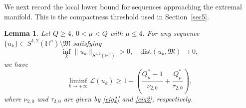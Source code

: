 \documentclass[11pt]{article}
\newtheorem{lemma}{Lemma}[section]
\begin{document}
{We next record the local lower bound for sequences approaching the extremal manifold. This is the compactness threshold used in Section~\ref{sec5}.}
\begin{lemma}\label{local}
Let $Q\geq 4$, $0<\mu< Q$ with $\mu\leq 4$. For any sequence $\{u_k\}\subset S^{1,2}(\mathbb{H}^{n})\setminus \mathfrak{M}$ satisfying
\begin{equation*}
 \inf\limits_k \|u_k\|_{S^{1,2}(\mathbb{H}^{n})}>0,\quad \mathrm{dist}(u_k,\mathfrak{M})\rightarrow0,
\end{equation*}
we have
\begin{equation}\label{local1}
 \liminf\limits_{k\rightarrow+\infty}\mathcal{L}(u_k)\geq 1-\left(\frac{Q^{\ast}_{\mu}-1}{\nu_{2,0}}+\frac{Q^{\ast}_{\mu}}{\tau_{2,0}}\right),
\end{equation}
{where $\nu_{2,0}$ and $\tau_{2,0}$ are given by \eqref{eig1} and \eqref{eig2}, respectively.}
\end{lemma}
\end{document}
